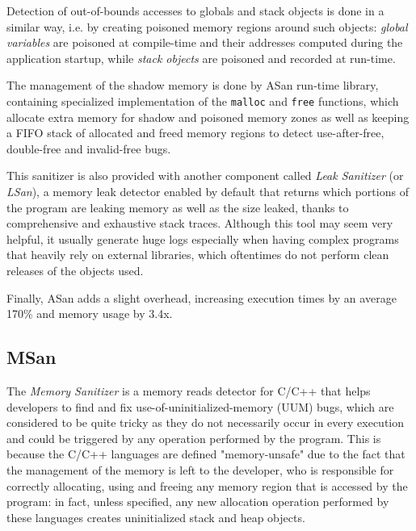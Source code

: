 Detection of out-of-bounds accesses to globals and stack objects is done in a similar way, i.e. by creating poisoned memory regions around such objects: \textit{global variables} are poisoned at compile-time and their addresses computed during the application startup, while \textit{stack objects} are poisoned and recorded at run-time.

The management of the shadow memory is done by ASan run-time library, containing specialized implementation of the \verb|malloc| and \verb|free| functions, which allocate extra memory for shadow and poisoned memory zones as well as keeping a FIFO stack of allocated and freed memory regions to detect use-after-free, double-free and invalid-free bugs.

This sanitizer is also provided with another component called \textit{Leak Sanitizer} (or \textit{LSan}), a memory leak detector enabled by default that returns which portions of the program are leaking memory as well as the size leaked, thanks to comprehensive and exhaustive stack traces. Although this tool may seem very helpful, it usually generate huge logs especially when having complex programs that heavily rely on external libraries, which oftentimes do not perform clean releases of the objects used.

Finally, ASan adds a slight overhead, increasing execution times by an average 170\% and memory usage by 3.4x. \cite{serebryany2012addresssanitizer}





\newpage
\subsection{MSan}
The \textit{Memory Sanitizer} \cite{stepanov2015memorysanitizer} is a memory reads detector for C/C++ that helps developers to find and fix use-of-uninitialized-memory (UUM) bugs, which are considered to be quite tricky as they do not necessarily occur in every execution and could be triggered by any operation performed by the program. This is because the C/C++ languages are defined "memory-unsafe" due to the fact that the management of the memory is left to the developer, who is responsible for correctly allocating, using and freeing any memory region that is accessed by the program: in fact, unless specified, any new allocation operation performed by these languages creates uninitialized stack and heap objects.

